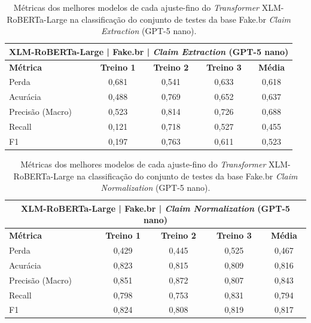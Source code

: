 \begin{table}[!htbp]
\centering
\begin{tabular}{l*4c}
\toprule
\multicolumn{5}{c}{\textbf{XLM-RoBERTa-Large | Fake.br | \textit{Claim Extraction} (GPT-5 nano)}} \\ 
\midrule
\textbf{Métrica} & \textbf{Treino 1} & \textbf{Treino 2} & \textbf{Treino 3} & \textbf{Média} \\ 
\midrule
Perda & 0,681 & 0,541 & 0,633 & 0,618 \\ 
Acurácia & 0,488 & 0,769 & 0,652 & 0,637 \\ 
Precisão (Macro) & 0,523 & 0,814 & 0,726 & 0,688 \\ 
Recall & 0,121 & 0,718 & 0,527 & 0,455 \\ 
F1 & 0,197 & 0,763 & 0,611 & 0,523 \\ 
\bottomrule
\end{tabular}
\caption{Métricas dos melhores modelos de cada ajuste-fino do \textit{Transformer} XLM-RoBERTa-Large na classificação do conjunto de testes da base Fake.br \textit{Claim Extraction} (GPT-5 nano).}
\end{table}

\begin{table}[!htbp]
\centering
\begin{tabular}{l*4c}
\toprule
\multicolumn{5}{c}{\textbf{XLM-RoBERTa-Large | Fake.br | \textit{Claim Normalization} (GPT-5 nano)}} \\ 
\midrule
\textbf{Métrica} & \textbf{Treino 1} & \textbf{Treino 2} & \textbf{Treino 3} & \textbf{Média} \\ 
\midrule
Perda & 0,429 & 0,445 & 0,525 & 0,467 \\ 
Acurácia & 0,823 & 0,815 & 0,809 & 0,816 \\ 
Precisão (Macro) & 0,851 & 0,872 & 0,807 & 0,843 \\ 
Recall & 0,798 & 0,753 & 0,831 & 0,794 \\ 
F1 & 0,824 & 0,808 & 0,819 & 0,817 \\ 
\bottomrule
\end{tabular}
\caption{Métricas dos melhores modelos de cada ajuste-fino do \textit{Transformer} XLM-RoBERTa-Large na classificação do conjunto de testes da base Fake.br \textit{Claim Normalization} (GPT-5 nano).}
\end{table}

